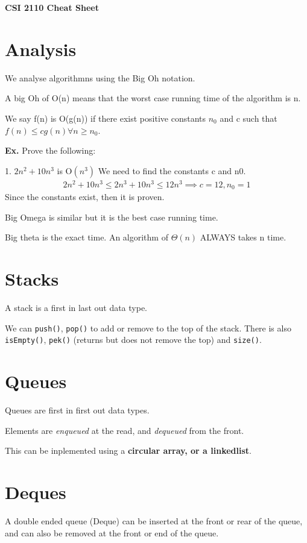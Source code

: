 \documentclass[12pt,letterpaper]{article} \usepackage{amsmath} \usepackage{graphicx} \usepackage[margin=1in]{geometry} \usepackage{longtable}  \usepackage{amssymb}
\begin{document}
	
	\begin{center}
		\Large\textbf{CSI 2110 Cheat Sheet} \\
		\vspace{0.5em}
	\end{center}
	
	\section{Analysis}
	We analyse algorithmns using the Big Oh notation. 
	
	A big Oh of O(n) means that the worst case running time of the algorithm is n.
	
	We say f(n) is O(g(n)) if there exist positive constants $n_0$ and c such that $f(n)\le cg(n) \forall n\ge n_0$.
	
	\begin{mdframed}
		\textbf{Ex. } Prove the following: 
		
		1. $2n^2 + 10n^3$ is O$(n^3)$
		We need to find the constants c and n0. 
		\begin{align*}
			2n^2 + 10n^3 \le 2n^3 + 10n^3 \le 12n^3 \implies c=12, n_0 = 1
		\end{align*}
		Since the constants exist, then it is proven.
	\end{mdframed}

	Big Omega is similar but it is the best case running time. 
	
	Big theta is the exact time. An algorithm of $\Theta(n)$ ALWAYS takes n time.
	
	\section{Stacks}
	A stack is a first in last out data type.
	
	We can \verb|push()|, \verb|pop()| to add or remove to the top of the stack. There is also \verb|isEmpty()|, \verb|pek()| (returns but does not remove the top) and \verb|size()|.
	
	\section{Queues}
	Queues are first in first out data types. 
	
	Elements are \textit{enqueued} at the read, and \textit{dequeued} from the front. 
	
	This can be inplemented using a \textbf{circular array, or a linkedlist}. 
	
	\section{Deques}
	A double ended queue (Deque) can be inserted at the front or rear of the queue, and can also be removed at the front or end of the queue. 
	
\end{document}
